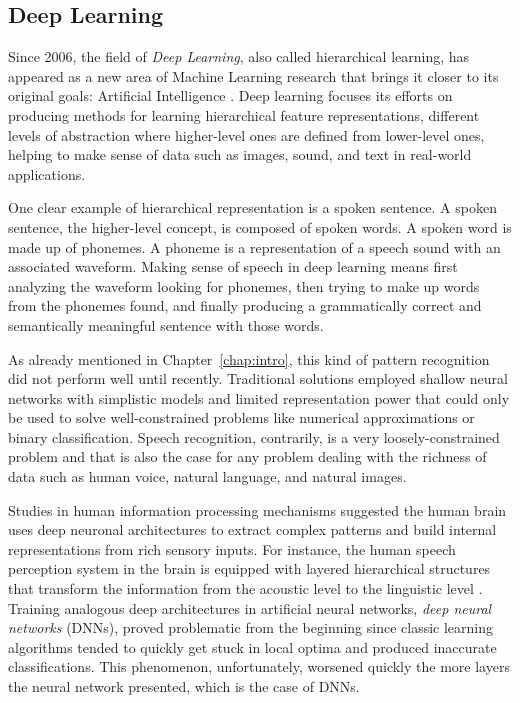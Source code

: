 \subsection{Deep Learning}
\label{sub:theory:background:deep-learning}

Since 2006, the field of \emph{Deep Learning}, also called hierarchical learning, has appeared as a new area of Machine Learning research that brings it closer to its original goals: Artificial Intelligence \cite{Deng2014}.
Deep learning focuses its efforts on producing methods for learning hierarchical feature representations, different levels of abstraction where higher-level ones are defined from lower-level ones, helping to make sense of data such as images, sound, and text in real-world applications.

One clear example of hierarchical representation is a spoken sentence.
A spoken sentence, the higher-level concept, is composed of spoken words.
A spoken word is made up of phonemes.
A phoneme is a representation of a speech sound with an associated waveform.
Making sense of speech in deep learning means first analyzing the waveform looking for phonemes, then trying to make up words from the phonemes found, and finally producing a grammatically correct and semantically meaningful sentence with those words.

As already mentioned in Chapter~\ref{chap:intro}, this kind of pattern recognition did not perform well until recently.
Traditional solutions employed shallow neural networks with simplistic models and limited representation power that could only be used to solve well-constrained problems like numerical approximations or binary classification.
Speech recognition, contrarily, is a very loosely-constrained problem and that is also the case for any problem dealing with the richness of data such as human voice, natural language, and natural images.

Studies in human information processing mechanisms suggested the human brain uses deep neuronal architectures to extract complex patterns and build internal representations from rich sensory inputs.
For instance, the human speech perception system in the brain is equipped with layered hierarchical structures that transform the information from the acoustic level to the linguistic level \cite{Deng1999,Baker2009}.
Training analogous deep architectures in artificial neural networks, \emph{deep neural networks} (DNNs), proved problematic from the beginning since classic learning algorithms tended to quickly get stuck in local optima and produced inaccurate classifications.
This phenomenon, unfortunately, worsened quickly the more layers the neural network presented, which is the case of DNNs.


